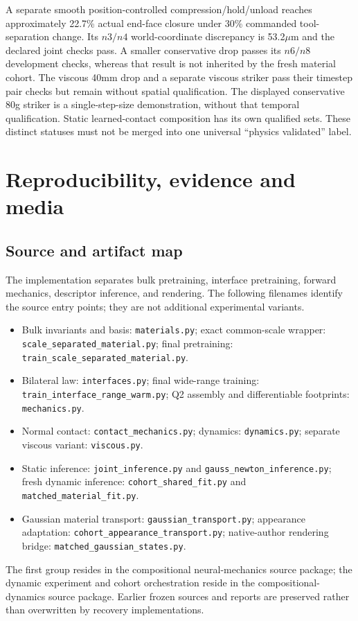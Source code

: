 \documentclass[10pt,twocolumn,letterpaper]{article}
\newcommand{\file}[1]{{\small\nolinkurl{#1}}}
\begin{document}
A separate smooth position-controlled compression/hold/unload reaches approximately 22.7\% actual end-face closure under 30\% commanded tool-separation change. Its $n3/n4$ world-coordinate discrepancy is 53.2$\mu$m and the declared joint checks pass. A smaller conservative drop passes its $n6/n8$ development checks, whereas that result is not inherited by the fresh material cohort. The viscous 40mm drop and a separate viscous striker pass their timestep pair checks but remain without spatial qualification. The displayed conservative 80g striker is a single-step-size demonstration, without that temporal qualification. Static learned-contact composition has its own qualified sets. These distinct statuses must not be merged into one universal ``physics validated'' label.

\section{Reproducibility, evidence and media}
\subsection{Source and artifact map}
The implementation separates bulk pretraining, interface pretraining, forward mechanics, descriptor inference, and rendering. The following filenames identify the source entry points; they are not additional experimental variants.

\begin{itemize}
\item Bulk invariants and basis: \file{materials.py}; exact common-scale wrapper: \file{scale_separated_material.py}; final pretraining: \file{train_scale_separated_material.py}.
\item Bilateral law: \file{interfaces.py}; final wide-range training: \file{train_interface_range_warm.py}; Q2 assembly and differentiable footprints: \file{mechanics.py}.
\item Normal contact: \file{contact_mechanics.py}; dynamics: \file{dynamics.py}; separate viscous variant: \file{viscous.py}.
\item Static inference: \file{joint_inference.py} and \file{gauss_newton_inference.py}; fresh dynamic inference: \file{cohort_shared_fit.py} and \file{matched_material_fit.py}.
\item Gaussian material transport: \file{gaussian_transport.py}; appearance adaptation: \file{cohort_appearance_transport.py}; native-author rendering bridge: \file{matched_gaussian_states.py}.
\end{itemize}
The first group resides in the compositional neural-mechanics source package; the dynamic experiment and cohort orchestration reside in the compositional-dynamics source package. Earlier frozen sources and reports are preserved rather than overwritten by recovery implementations.
\end{document}

